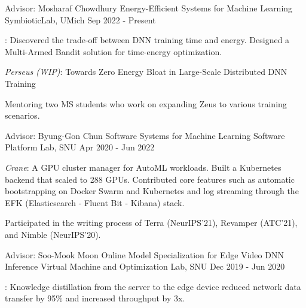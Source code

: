 

\begin{cventries}

  \cventryexp
    {Advisor: Mosharaf Chowdhury}
    {Energy-Efficient Systems for Machine Learning}
    {SymbioticLab, UMich}
    {Sep 2022 - Present}
    {
      \begin{cvitems}
        \item {\href{https://ml.energy/zeus}{}: Discovered the trade-off between DNN training time and energy. Designed a Multi-Armed Bandit solution for time-energy optimization.}
        \item {\textit{Perseus (WIP)}: Towards Zero Energy Bloat in Large-Scale Distributed DNN Training}
        \item {Mentoring two MS students who work on expanding Zeus to various training scenarios.}
      \end{cvitems}
    }
    
  \cventryexp
    {Advisor: Byung-Gon Chun}
    {Software Systems for Machine Learning}
    {Software Platform Lab, SNU}
    {Apr 2020 - Jun 2022}
    {
      \begin{cvitems}
        \item {\textit{Crane}: A GPU cluster manager for AutoML workloads. Built a Kubernetes backend that scaled to 288 GPUs. Contributed core features such as automatic bootstrapping on Docker Swarm and Kubernetes and log streaming through the EFK (Elasticsearch - Fluent Bit - Kibana) stack.}
        \item {Participated in the writing process of Terra (NeurIPS'21), Revamper (ATC'21), and Nimble (NeurIPS'20).}
      \end{cvitems}
    }
    
  \cventryexp
    {Advisor: Soo-Mook Moon}
    {Online Model Specialization for Edge Video DNN Inference}
    {Virtual Machine and Optimization Lab, SNU}
    {Dec 2019 - Jun 2020}
    {
      \begin{cvitems}
      \item {\href{https://github.com/jaywonchung/shadowtutor}{}: Knowledge distillation from the server to the edge device reduced network data transfer by 95\% and increased throughput by 3x.}
      \end{cvitems}
    }
    

\end{cventries}
